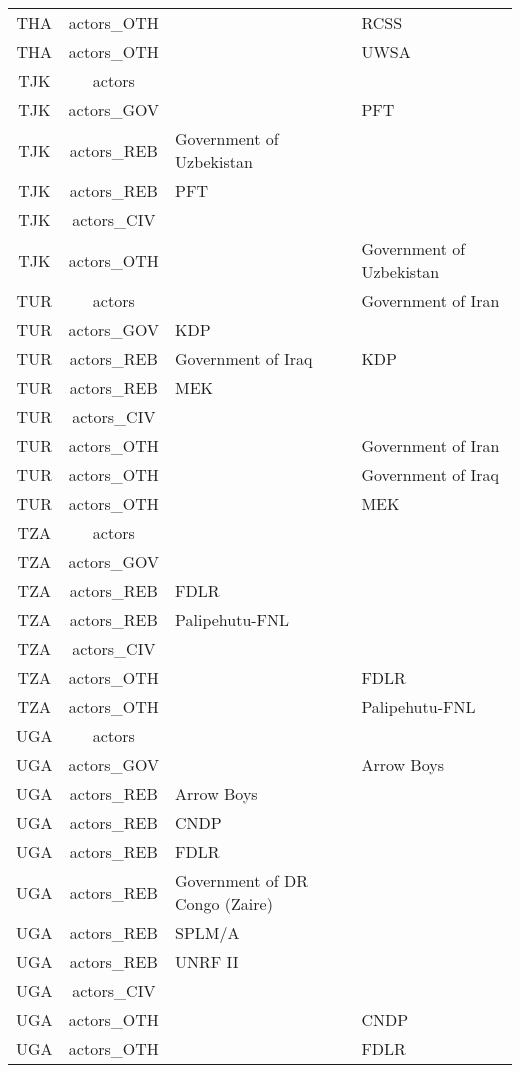 \documentclass[12pt]{article}
\begin{document}
\begin{center}
\begin{longtable}{|c|c|p{7cm}|p{7cm}|}
  THA & actors\_OTH &  & RCSS \\ 
  THA & actors\_OTH &  & UWSA \\ 
  TJK & actors &  &  \\ 
  TJK & actors\_GOV &  & PFT \\ 
  TJK & actors\_REB & Government of Uzbekistan &  \\ 
  TJK & actors\_REB & PFT &  \\ 
  TJK & actors\_CIV &  &  \\ 
  TJK & actors\_OTH &  & Government of Uzbekistan \\ 
  TUR & actors &  & Government of Iran \\ 
  TUR & actors\_GOV & KDP &  \\ 
  TUR & actors\_REB & Government of Iraq & KDP \\ 
  TUR & actors\_REB & MEK &  \\ 
  TUR & actors\_CIV &  &  \\ 
  TUR & actors\_OTH &  & Government of Iran \\ 
  TUR & actors\_OTH &  & Government of Iraq \\ 
  TUR & actors\_OTH &  & MEK \\ 
  TZA & actors &  &  \\ 
  TZA & actors\_GOV &  &  \\ 
  TZA & actors\_REB & FDLR &  \\ 
  TZA & actors\_REB & Palipehutu-FNL &  \\ 
  TZA & actors\_CIV &  &  \\ 
  TZA & actors\_OTH &  & FDLR \\ 
  TZA & actors\_OTH &  & Palipehutu-FNL \\ 
  UGA & actors &  &  \\ 
  UGA & actors\_GOV &  & Arrow Boys \\ 
  UGA & actors\_REB & Arrow Boys &  \\ 
  UGA & actors\_REB & CNDP &  \\ 
  UGA & actors\_REB & FDLR &  \\ 
  UGA & actors\_REB & Government of DR Congo (Zaire) &  \\ 
  UGA & actors\_REB & SPLM/A &  \\ 
  UGA & actors\_REB & UNRF II &  \\ 
  UGA & actors\_CIV &  &  \\ 
  UGA & actors\_OTH &  & CNDP \\ 
  UGA & actors\_OTH &  & FDLR \\ 

\end{longtable}
\end{center}
\end{document}
